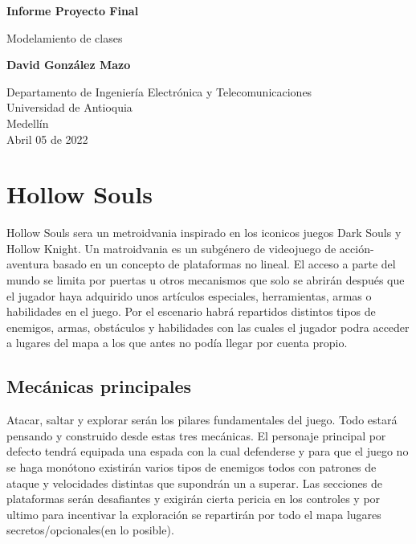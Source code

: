 \documentclass{article}
\begin{document}
\begin{titlepage}
    \begin{center}
        \vspace*{1cm}
            
        \Huge
        \textbf{Informe Proyecto Final}
            
        \vspace{0.5cm}
        \LARGE
        Modelamiento de clases
            
        \vspace{1.5cm}
            
        \textbf{David González Mazo}

        \vfill
            
        \vspace{0.8cm}
            
        \Large
        Departamento de Ingeniería Electrónica y Telecomunicaciones\\
        Universidad de Antioquia\\
        Medellín\\
        Abril 05 de 2022
            
    \end{center}
\end{titlepage}

\tableofcontents

\newpage
\section{Hollow Souls}\label{intro}
Hollow Souls sera un metroidvania inspirado en los iconicos juegos Dark Souls y Hollow Knight.\newline
Un matroidvania es un subgénero de videojuego de acción-aventura basado en un concepto de plataformas no lineal.
El acceso a parte del mundo se limita por puertas u otros mecanismos que solo se abrirán después que el jugador haya adquirido unos artículos especiales, herramientas, armas o habilidades en el juego.\newline 
Por el escenario habrá repartidos distintos tipos de enemigos, armas, obstáculos y habilidades con las cuales el jugador podra acceder a lugares del mapa a los que antes no podía llegar por cuenta propio. \newline

\subsection{Mecánicas principales}
Atacar, saltar y explorar serán los pilares fundamentales del juego. Todo estará pensando y construido desde estas tres mecánicas. \newline
El personaje principal por defecto tendrá equipada una espada con la cual defenderse y para que el juego no se haga monótono existirán varios tipos de enemigos todos con patrones de ataque y velocidades distintas que supondrán un a superar. Las secciones de plataformas serán desafiantes y exigirán cierta pericia en los controles y por ultimo para incentivar la exploración se repartirán por todo el mapa lugares secretos/opcionales(en lo posible).\newline
\end{document}
